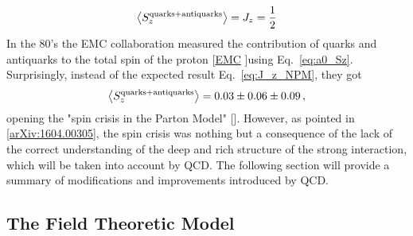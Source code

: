 \begin{equation}
  \left< S_{z}^{\textrm{quarks} + \textrm{antiquarks}} \right> = J_{z} = \frac{1}{2}
  \label{eq:J_z_NPM}
\end{equation}
In the 80's the EMC collaboration measured the contribution of quarks and antiquarks to the total spin of the proton [\href{https://inspirehep.net/literature/280143}{EMC} ]using Eq.~\eqref{eq:a0_Sz}. Surprisingly, instead of the expected result Eq.~\eqref{eq:J_z_NPM}, they got
\begin{equation}
  \left< S_{z}^{\textrm{quarks} + \textrm{antiquarks}} \right> = 0.03 \pm 0.06 \pm 0.09 \,,
  \label{eq:EMC_exp}
\end{equation}
opening the "spin crisis in the Parton Model" [\cite{Leader_Anselmino}]. However, as pointed in [\href{https://arxiv.org/abs/1604.00305v2}{arXiv:1604.00305}], the spin crisis was nothing but a consequence of the lack of the correct understanding of the deep and rich structure of the strong interaction, which will be taken into account by QCD. The following section will provide a summary of modifications and improvements introduced by QCD.

\subsection{The Field Theoretic Model}
\label{sec:field_theoretic}

